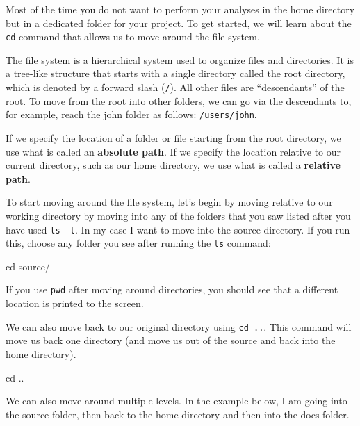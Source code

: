 \documentclass[
  letterpaper,
  DIV=11,
  numbers=noendperiod]{scrreprt}
\newenvironment{Shaded}{}{}
\newcommand{\BuiltInTok}[1]{\textcolor[rgb]{0.84,0.23,0.29}{#1}}
\newcommand{\NormalTok}[1]{\textcolor[rgb]{0.14,0.16,0.18}{#1}}
\begin{document}
Most of the time you do not want to perform your analyses in the home
directory but in a dedicated folder for your project. To get started, we
will learn about the \texttt{cd} command that allows us to move around
the file system.

The file system is a hierarchical system used to organize files and
directories. It is a tree-like structure that starts with a single
directory called the root directory, which is denoted by a forward slash
(\texttt{/}). All other files are ``descendants'' of the root. To move
from the root into other folders, we can go via the descendants to, for
example, reach the john folder as follows: \texttt{/users/john}.

If we specify the location of a folder or file starting from the root
directory, we use what is called an \textbf{absolute path}. If we
specify the location relative to our current directory, such as our home
directory, we use what is called a \textbf{relative path}.

To start moving around the file system, let's begin by moving relative
to our working directory by moving into any of the folders that you saw
listed after you have used \texttt{ls\ -l}. In my case I want to move
into the source directory. If you run this, choose any folder you see
after running the \texttt{ls} command:

\begin{Shaded}
\begin{Highlighting}[]
\BuiltInTok{cd}\NormalTok{ source/}
\end{Highlighting}
\end{Shaded}

If you use \texttt{pwd} after moving around directories, you should see
that a different location is printed to the screen.

We can also move back to our original directory using \texttt{cd\ ..}.
This command will move us back one directory (and move us out of the
source and back into the home directory).

\begin{Shaded}
\begin{Highlighting}[]
\BuiltInTok{cd}\NormalTok{ ..}
\end{Highlighting}
\end{Shaded}

We can also move around multiple levels. In the example below, I am
going into the source folder, then back to the home directory and then
into the docs folder.
\end{document}

